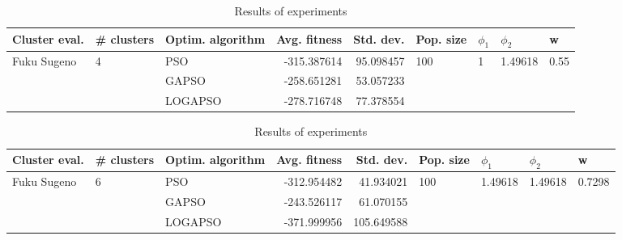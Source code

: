 \documentclass{article}
\begin{document}
\begin{table}
\centering
\caption{Results of experiments}
\begin{tabular}{lllrrllll}
\toprule
               Cluster eval. &        \# clusters & Optim. algorithm &  Avg. fitness &  Std. dev. &            Pop. size &         $\phi_{1}$ &               $\phi_{2}$ &                     w \\
\midrule
\multirow{3}{*}{Fuku Sugeno} & \multirow{3}{*}{4} &              PSO &   -315.387614 &  95.098457 & \multirow{3}{*}{100} & \multirow{3}{*}{1} & \multirow{3}{*}{1.49618} & \multirow{3}{*}{0.55} \\
                             &                    &            GAPSO &   -258.651281 &  53.057233 &                      &                    &                          &                       \\
                             &                    &          LOGAPSO &   -278.716748 &  77.378554 &                      &                    &                          &                       \\
\bottomrule
\end{tabular}
\end{table}
\begin{table}
\centering
\caption{Results of experiments}
\begin{tabular}{lllrrllll}
\toprule
               Cluster eval. &        \# clusters & Optim. algorithm &  Avg. fitness &  Std. dev. &            Pop. size &               $\phi_{1}$ &               $\phi_{2}$ &                       w \\
\midrule
\multirow{3}{*}{Fuku Sugeno} & \multirow{3}{*}{6} &              PSO &   -312.954482 &  41.934021 & \multirow{3}{*}{100} & \multirow{3}{*}{1.49618} & \multirow{3}{*}{1.49618} & \multirow{3}{*}{0.7298} \\
                             &                    &            GAPSO &   -243.526117 &  61.070155 &                      &                          &                          &                         \\
                             &                    &          LOGAPSO &   -371.999956 & 105.649588 &                      &                          &                          &                         \\
\bottomrule
\end{tabular}
\end{table}
\end{document}

